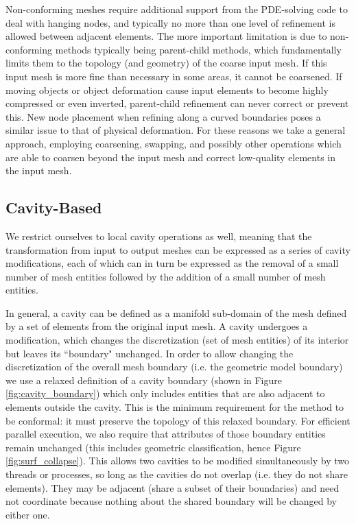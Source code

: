 Non-conforming meshes require additional support from
the PDE-solving code to deal with hanging nodes, and typically
no more than one level of refinement is allowed between adjacent
elements.
The more important limitation is due to non-conforming methods
typically being parent-child methods, which fundamentally limits
them to the topology (and geometry) of the coarse input mesh.
If this input mesh is more fine than necessary in some areas,
it cannot be coarsened.
If moving objects or object deformation cause input elements
to become highly compressed or even inverted, parent-child
refinement can never correct or prevent this.
New node placement when refining along a curved boundaries poses
a similar issue to that of physical deformation.
For these reasons we take a general approach, employing
coarsening, swapping, and possibly other operations which are
able to coarsen beyond the input mesh and correct low-quality
elements in the input mesh.

\subsection{Cavity-Based}

We restrict ourselves to local cavity operations as well,
meaning that the transformation from input to output meshes
can be expressed as a series of cavity modifications, each
of which can in turn be expressed as the removal of
a small number of mesh entities followed by the addition
of a small number of mesh entities.

In general, a cavity can be defined as a manifold sub-domain
of the mesh defined by a set of elements from the original
input mesh.
A cavity undergoes a modification, which changes the discretization
(set of mesh entities) of its interior but leaves its ``boundary" unchanged.
In order to allow changing the discretization of the overall
mesh boundary (i.e. the geometric model boundary)
we use a relaxed definition of a cavity boundary
(shown in Figure \ref{fig:cavity_boundary}) which only includes
entities that are also adjacent to elements outside the cavity.
This is the minimum requirement for the method to be conformal:
it must preserve the topology of this relaxed boundary.
For efficient parallel execution, we also require that attributes
of those boundary entities remain unchanged (this includes
geometric classification, hence Figure \ref{fig:surf_collapse}).
This allows two cavities to be modified simultaneously by two
threads or processes, so long as the cavities do not overlap
(i.e. they do not share elements).
They may be adjacent (share a subset of their boundaries) and
need not coordinate because nothing about the shared boundary
will be changed by either one.

